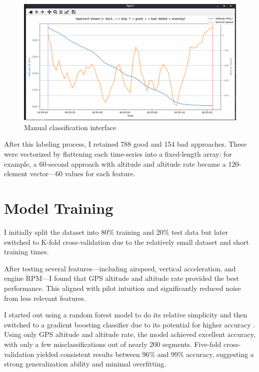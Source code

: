 \documentclass[conference]{IEEEtran}
\begin{document}
\begin{figure}[H]
    \centerline{\includegraphics[width=\linewidth]{approach_viewer.png}}
    \caption{Manual classification interface}
\end{figure}
  
After this labeling process, I retained 788 good and 154 bad approaches. These were vectorized by flattening each time-series into a fixed-length array: for example, a 60-second approach with altitude and altitude rate became a 120-element vector—60 values for each feature.

\section{Model Training}
I initially split the dataset into 80\% training and 20\% test data but later switched to K-fold cross-validation due to the relatively small dataset and short training times.

After testing several features—including airspeed, vertical acceleration, and engine RPM—I found that GPS altitude and altitude rate provided the best performance. This aligned with pilot intuition and significantly reduced noise from less relevant features.

I started out using a random forest model to do its relative simplicity and then switched to a gradient boosting classifier due to its potential for higher accuracy \cite{chen2016xgboost}. Using only GPS altitude and altitude rate, the model achieved excellent accuracy, with only a few misclassifications out of nearly 200 segments. Five-fold cross-validation yielded consistent results between 96\% and 99\% accuracy, suggesting a strong generalization ability and minimal overfitting.
\end{document}
